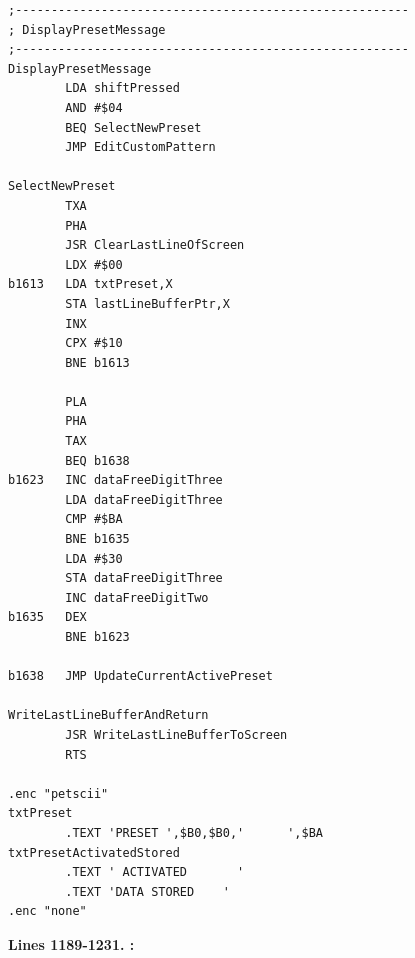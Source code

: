 \clearpage
\begin{lstlisting}
;-------------------------------------------------------
; DisplayPresetMessage
;-------------------------------------------------------
DisplayPresetMessage    
        LDA shiftPressed
        AND #$04
        BEQ SelectNewPreset
        JMP EditCustomPattern

SelectNewPreset
        TXA 
        PHA 
        JSR ClearLastLineOfScreen
        LDX #$00
b1613   LDA txtPreset,X
        STA lastLineBufferPtr,X
        INX 
        CPX #$10
        BNE b1613

        PLA 
        PHA 
        TAX 
        BEQ b1638
b1623   INC dataFreeDigitThree
        LDA dataFreeDigitThree
        CMP #$BA
        BNE b1635
        LDA #$30
        STA dataFreeDigitThree
        INC dataFreeDigitTwo
b1635   DEX 
        BNE b1623

b1638   JMP UpdateCurrentActivePreset

WriteLastLineBufferAndReturn    
        JSR WriteLastLineBufferToScreen
        RTS 

.enc "petscii" 
txtPreset
        .TEXT 'PRESET ',$B0,$B0,'      ',$BA
txtPresetActivatedStored
        .TEXT ' ACTIVATED       '
        .TEXT 'DATA STORED    '
.enc "none" 
\end{lstlisting}
\clearpage

\textbf{Lines 1189-1231. :} 
\clearpage

